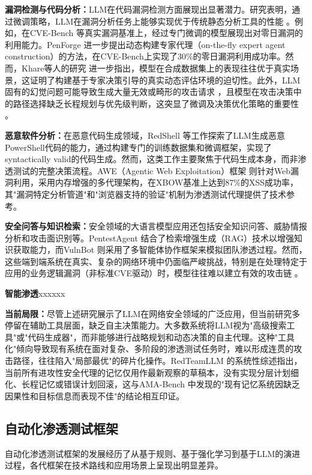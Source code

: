 \documentclass[a4paper, twocolumn]{article}
\begin{document}
\textbf{漏洞检测与代码分析：}LLM在代码漏洞检测方面展现出显著潜力。研究表明，通过微调策略，LLM在漏洞分析任务上能够实现优于传统静态分析工具的性能 \cite{sultana2026llms}。例如，在CVE-Bench \cite{chen2025cvebench} 等真实漏洞基准上，经过专门微调的模型展现出对零日漏洞的利用能力。PenForge \cite{fang2026penforge} 进一步提出动态构建专家代理（on-the-fly expert agent construction）的方法，在CVE-Bench上实现了30\%的零日漏洞利用成功率。然而，Khare等人的研究 \cite{khare2024understanding} 进一步指出，模型在合成数据集上的表现往往优于真实场景，这证明了构建基于专家决策引导的真实动态评估环境的迫切性。此外，LLM固有的幻觉问题可能导致生成大量无效或畸形的攻击请求 \cite{happe2025benchmarking}，且模型在攻击决策中的路径选择缺乏长程规划与优先级判断，这突显了微调及决策优化策略的重要性 \cite{sultana2026llms}。

\textbf{恶意软件分析：}在恶意代码生成领域，RedShell \cite{bessa2026redshell} 等工作探索了LLM生成恶意PowerShell代码的能力，通过构建专门的训练数据集和微调框架，实现了syntactically valid的代码生成。然而，这类工作主要聚焦于代码生成本身，而非渗透测试的完整决策流程。AWE（Agentic Web Exploitation）框架 \cite{liu2026awe} 则针对Web漏洞利用，采用内存增强的多代理架构，在XBOW基准上达到87\%的XSS成功率，其"漏洞特定分析管道"和"浏览器支持的验证"机制为渗透测试代理提供了技术参考。

\textbf{安全问答与知识检索：}安全领域的大语言模型应用还包括安全知识问答、威胁情报分析和攻击面识别等。PentestAgent \cite{shen2025pentestagent} 结合了检索增强生成（RAG）技术以增强知识获取能力，而VulnBot  \cite{kong2025vulnbot} 则采用了多智能体协作框架来模拟团队渗透过程。然而，这些端到端系统在真实、复杂的网络环境中仍面临严峻挑战，特别是在处理特定于应用的业务逻辑漏洞（非标准CVE驱动）时，模型往往难以建立有效的攻击链 \cite{chang2024survey}。

\textbf{智能渗透}xxxxxx

\textbf{当前局限：}尽管上述研究展示了LLM在网络安全领域的广泛应用，但当前研究多停留在辅助工具层面，缺乏自主决策能力。大多数系统将LLM视为"高级搜索工具"或"代码生成器"，而非能够进行战略规划和动态决策的自主代理。这种"工具化"倾向导致现有系统在面对复杂、多阶段的渗透测试任务时，难以形成连贯的攻击路径，往往陷入"局部最优"的碎片化操作。RedTeamLLM \cite{challita2025redteamllm} 的系统性综述指出，当前所有进攻性安全代理的记忆仅用作最新观察的草稿本，没有实现分层计划细化、长程记忆或错误计划回滚，这与AMA-Bench \cite{yuan2026amabench} 中发现的"现有记忆系统因缺乏因果性和目标信息而表现不佳"的结论相互印证。

\subsection{自动化渗透测试框架}
自动化渗透测试框架的发展经历了从基于规则、基于强化学习到基于LLM的演进过程，各代框架在技术路线和应用场景上呈现出明显差异。
\end{document}
